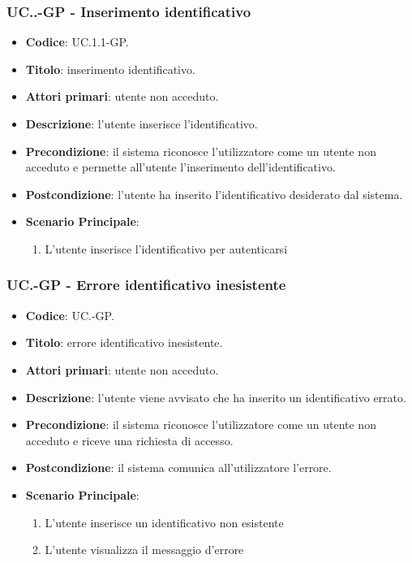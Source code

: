 		\subsubsection{UC\theuccount.\thesubuccount.\thesubsubuccount-GP - Inserimento identificativo}
			\begin{itemize}
				\item \textbf{Codice}: UC\theuccount.1.1-GP.
				\item \textbf{Titolo}: inserimento identificativo.
				\item \textbf{Attori primari}: utente non acceduto.
				\item \textbf{Descrizione}: l'utente inserisce l'identificativo.
				\item \textbf{Precondizione}: il sistema riconosce l'utilizzatore come un utente non acceduto e permette all'utente l'inserimento dell'identificativo.
				\item \textbf{Postcondizione}: l'utente ha inserito l'identificativo desiderato dal sistema.
				\item \textbf{Scenario Principale}:
				\begin{enumerate}
					\item L'utente inserisce l'identificativo per autenticarsi
				\end{enumerate}
			\end{itemize}
	
	\subsubsection{UC\theuccount.\thesubuccount-GP - Errore identificativo inesistente}
		\begin{itemize}
			\item \textbf{Codice}: UC\theuccount.\thesubuccount-GP.
			\item \textbf{Titolo}: errore identificativo inesistente.
			\item \textbf{Attori primari}: utente non acceduto.
			\item \textbf{Descrizione}: l'utente viene avvisato che ha inserito un identificativo errato.
			\item \textbf{Precondizione}: il sistema riconosce l'utilizzatore come un utente non acceduto e riceve una richiesta di accesso. 
			\item \textbf{Postcondizione}: il sistema comunica all'utilizzatore l'errore.
			\item \textbf{Scenario Principale}:
			\begin{enumerate}
				\item L'utente inserisce un identificativo non esistente
				\item L'utente visualizza il messaggio d'errore
			\end{enumerate}
		\end{itemize}
